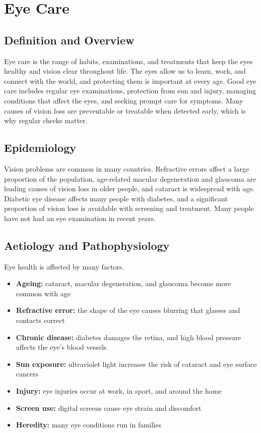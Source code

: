 \chapter{Eye Care}

\section*{Definition and Overview}
Eye care is the range of habits, examinations, and treatments that keep the eyes healthy and vision clear throughout life. The eyes allow us to learn, work, and connect with the world, and protecting them is important at every age. Good eye care includes regular eye examinations, protection from sun and injury, managing conditions that affect the eyes, and seeking prompt care for symptoms. Many causes of vision loss are preventable or treatable when detected early, which is why regular checks matter.

\section*{Epidemiology}
Vision problems are common in many countries. Refractive errors affect a large proportion of the population, age-related macular degeneration and glaucoma are leading causes of vision loss in older people, and cataract is widespread with age. Diabetic eye disease affects many people with diabetes, and a significant proportion of vision loss is avoidable with screening and treatment. Many people have not had an eye examination in recent years.

\section*{Aetiology and Pathophysiology}
Eye health is affected by many factors.
\begin{itemize}
    \item \textbf{Ageing:} cataract, macular degeneration, and glaucoma become more common with age
    \item \textbf{Refractive error:} the shape of the eye causes blurring that glasses and contacts correct
    \item \textbf{Chronic disease:} diabetes damages the retina, and high blood pressure affects the eye's blood vessels
    \item \textbf{Sun exposure:} ultraviolet light increases the risk of cataract and eye surface cancers
    \item \textbf{Injury:} eye injuries occur at work, in sport, and around the home
    \item \textbf{Screen use:} digital screens cause eye strain and discomfort
    \item \textbf{Heredity:} many eye conditions run in families
\end{itemize}

